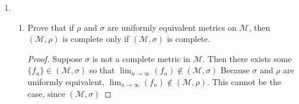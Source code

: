 \documentclass{article}
\begin{document}
\begin{enumerate}
\begin{enumerate}
                        \begin{proof}
                              Let $\{f_n\}$ be a Cauchy sequence in this subset.
                              Then, since $\{f_n\}$ is on $C[a,b]$ and $C[a,b]$
                              is complete, there is a continuous function $f$
                              on $[a,b]$ such that $f_n\to f$ uniformly. We also
                              know that for all $x\in[c,d]$, $f(x)=0$. Since
                              $C[a,b]$ is complete in $\rho_\infty$, and all
                              $f_n$ in the sequence are equivalent to 0 on
                              $[c,d]$, it is clear that $f$ is also in this
                              subset.
                        \end{proof}
                  \item $\{f\in C[a,b]|\lvert f(x)\rvert\leq 2+f(x)^2$
                        for $x\in[a,b]\}$.
                        \begin{proof}
                              Let $\{f_n\}$ be a Cauchy sequence in this subset.
                              Then, since $\{f_n\}$ is on $C[a,b]$ and $C[a,b]$
                              is complete, there is a continuous function $f$
                              on $[a,b]$ such that $f_n\to f$ uniformly.
                        \end{proof}
            \end{enumerate}
            \setcounter{enumi}{9}
      \item \begin{enumerate}
                  \item Prove that if $\rho$ and $\sigma$ are uniformly
                        equivalent metrics on $\mathcal{M}$, then
                        $(\mathcal{M}, \rho)$ is complete only if
                        $(\mathcal{M}, \sigma)$ is complete.
                        \begin{proof}
                              Suppose $\sigma$ is not a complete metric in
                              $\mathcal{M}$. Then there exists some
                              $\{f_n\}\in(\mathcal{M}, \sigma)$ so that
                              $\lim_{n\to\infty}(f_n)\notin(\mathcal{M}, \sigma)$
                              Because $\sigma$ and $\rho$ are uniformly equivalent,
                              $\lim_{n\to\infty}(f_n)\notin(\mathcal{M}, \rho)$.
                              This cannot be the case, since $(\mathcal{M}, \sigma)$

\end{proof}
\end{enumerate}
\end{enumerate}
\end{document}
